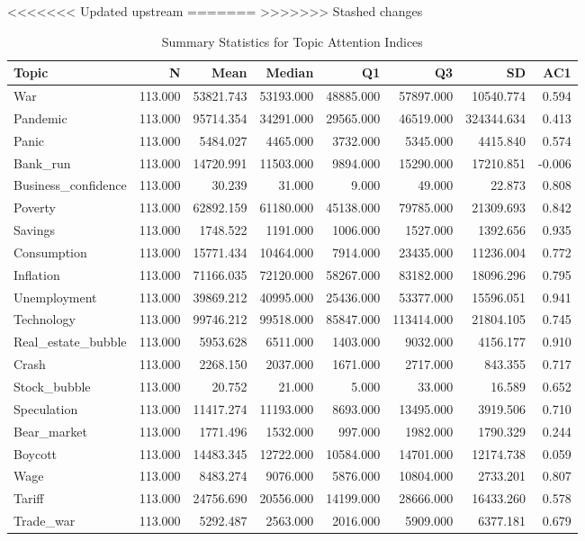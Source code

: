<<<<<<< Updated upstream
=======
>>>>>>> Stashed changes
\begin{table}[ht]
\centering
\begin{tabular}{lrrrrrrr}
  \hline
Topic & N & Mean & Median & Q1 & Q3 & SD & AC1 \\ 
  \hline
War & 113.000 & 53821.743 & 53193.000 & 48885.000 & 57897.000 & 10540.774 & 0.594 \\ 
  Pandemic & 113.000 & 95714.354 & 34291.000 & 29565.000 & 46519.000 & 324344.634 & 0.413 \\ 
  Panic & 113.000 & 5484.027 & 4465.000 & 3732.000 & 5345.000 & 4415.840 & 0.574 \\ 
  Bank\_run & 113.000 & 14720.991 & 11503.000 & 9894.000 & 15290.000 & 17210.851 & -0.006 \\ 
  Business\_confidence & 113.000 & 30.239 & 31.000 & 9.000 & 49.000 & 22.873 & 0.808 \\ 
  Poverty & 113.000 & 62892.159 & 61180.000 & 45138.000 & 79785.000 & 21309.693 & 0.842 \\ 
  Savings & 113.000 & 1748.522 & 1191.000 & 1006.000 & 1527.000 & 1392.656 & 0.935 \\ 
  Consumption & 113.000 & 15771.434 & 10464.000 & 7914.000 & 23435.000 & 11236.004 & 0.772 \\ 
  Inflation & 113.000 & 71166.035 & 72120.000 & 58267.000 & 83182.000 & 18096.296 & 0.795 \\ 
  Unemployment & 113.000 & 39869.212 & 40995.000 & 25436.000 & 53377.000 & 15596.051 & 0.941 \\ 
  Technology & 113.000 & 99746.212 & 99518.000 & 85847.000 & 113414.000 & 21804.105 & 0.745 \\ 
  Real\_estate\_bubble & 113.000 & 5953.628 & 6511.000 & 1403.000 & 9032.000 & 4156.177 & 0.910 \\ 
  Crash & 113.000 & 2268.150 & 2037.000 & 1671.000 & 2717.000 & 843.355 & 0.717 \\ 
  Stock\_bubble & 113.000 & 20.752 & 21.000 & 5.000 & 33.000 & 16.589 & 0.652 \\ 
  Speculation & 113.000 & 11417.274 & 11193.000 & 8693.000 & 13495.000 & 3919.506 & 0.710 \\ 
  Bear\_market & 113.000 & 1771.496 & 1532.000 & 997.000 & 1982.000 & 1790.329 & 0.244 \\ 
  Boycott & 113.000 & 14483.345 & 12722.000 & 10584.000 & 14701.000 & 12174.738 & 0.059 \\ 
  Wage & 113.000 & 8483.274 & 9076.000 & 5876.000 & 10804.000 & 2733.201 & 0.807 \\ 
  Tariff & 113.000 & 24756.690 & 20556.000 & 14199.000 & 28666.000 & 16433.260 & 0.578 \\ 
  Trade\_war & 113.000 & 5292.487 & 2563.000 & 2016.000 & 5909.000 & 6377.181 & 0.679 \\ 
   \hline
\end{tabular}
\caption{Summary Statistics for Topic Attention Indices} 
\label{tab:topic_summary}
\end{table}
